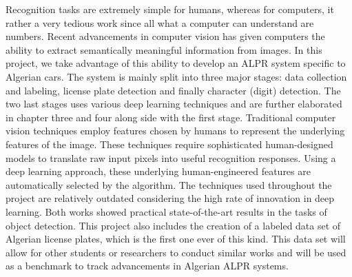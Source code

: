 Recognition tasks are extremely simple for humans, whereas for computers, it rather a very tedious work since all what a computer can understand are numbers. Recent advancements in computer vision has given computers the ability to extract semantically meaningful information from images. In this project, we take advantage of this ability to develop an ALPR system specific to Algerian cars. The system is mainly split into three major stages: data collection and labeling, license plate detection and finally character (digit) detection. The two last stages uses various deep learning techniques and are further elaborated in chapter three and four along side with the first stage.
Traditional computer vision techniques employ features chosen by humans to represent the underlying features of the image. These techniques require sophisticated human-designed models to translate raw input pixels into useful recognition responses. Using a deep learning approach, these underlying human-engineered features are automatically selected by the algorithm.
The techniques used throughout the project are relatively outdated considering the high rate of innovation in deep learning. Both works showed practical state-of-the-art results in the tasks of object detection. This project also includes the creation of a labeled data set of Algerian license plates, which is the first one ever of this kind. This data set will allow for other students or researchers to conduct similar works and will be used as a benchmark to track advancements in Algerian ALPR systems.
